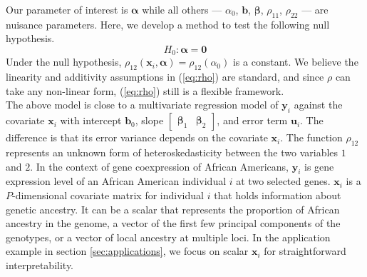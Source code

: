\documentclass[aap,authoryear, preprint]{imsart}
\numberwithin{equation}{section}
\theoremstyle{plain}
\begin{document}
Our parameter of interest is $\bm{\alpha}$ while all others --- $\alpha_0$, $\bm{b}$, $\bm{\beta}$, $\rho_{11}$, $\rho_{22}$ --- are nuisance parameters. Here, we develop a method to test the following null hypothesis.
\begin{equation}
    H_0: \bm{\alpha} = \bm{0}
    \label{eq:null}
\end{equation}
Under the null hypothesis, $\rho_{12}(\bm{x}_i, \bm{\alpha}) = \rho_{12}(\alpha_0)$ is a constant. We believe the linearity and additivity assumptions in (\ref{eq:rho}) are standard, and since $\rho$ can take any non-linear form, (\ref{eq:rho}) still is a flexible framework. \\

The above model is close to a multivariate regression model of $\bm{y}_i$ against the covariate $\bm{x}_i$ with intercept $\bm{b}_0$, slope $\begin{bmatrix} \bm{\beta}_1 & \bm{\beta}_2 \end{bmatrix}$, and error term $\bm{u}_i$. The difference is that its error variance depends on the covariate $\bm{x}_i$. The function $\rho_{12}$ represents an unknown form of heteroskedasticity between the two variables $1$ and $2$. In the context of gene coexpression of African Americans, $\bm{y}_i$ is gene expression level of an African American individual $i$ at two selected genes. $\bm{x}_i$ is a $P$-dimensional covariate matrix for individual $i$ that holds information about genetic ancestry. It can be a scalar that represents the proportion of African ancestry in the genome, a vector of the first few principal components of the genotypes, or a vector of local ancestry at multiple loci. In the application example in section \ref{sec:applications}, we focus on scalar $\bm{x}_i$ for straightforward interpretability. \\
\end{document}

